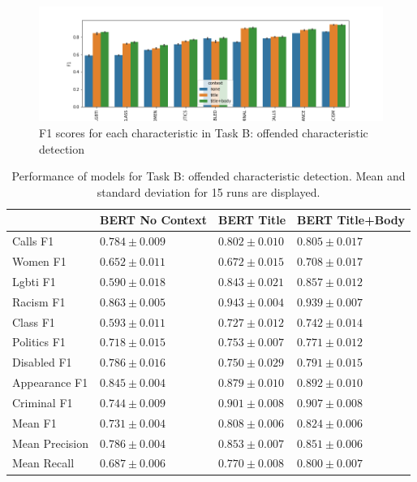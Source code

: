 \begin{figure}[t]
    \centering
    \includegraphics[width=\textwidth]{img/task_b_scores.png}
    \caption{F1 scores for each characteristic in Task B: offended characteristic detection}
    \label{fig:task_b_results}
\end{figure}

\begin{table}
    \centering
    \begin{tabular}{llll}
        \toprule
        {} &    BERT No Context &         BERT Title &    BERT Title+Body \\
        \midrule
        Calls F1       &  $0.784 \pm 0.009$ &  $0.802 \pm 0.010$ &  $0.805 \pm 0.017$ \\
        Women F1       &  $0.652 \pm 0.011$ &  $0.672 \pm 0.015$ &  $0.708 \pm 0.017$ \\
        Lgbti F1       &  $0.590 \pm 0.018$ &  $0.843 \pm 0.021$ &  $0.857 \pm 0.012$ \\
        Racism F1      &  $0.863 \pm 0.005$ &  $0.943 \pm 0.004$ &  $0.939 \pm 0.007$ \\
        Class F1       &  $0.593 \pm 0.011$ &  $0.727 \pm 0.012$ &  $0.742 \pm 0.014$ \\
        Politics F1    &  $0.718 \pm 0.015$ &  $0.753 \pm 0.007$ &  $0.771 \pm 0.012$ \\
        Disabled F1    &  $0.786 \pm 0.016$ &  $0.750 \pm 0.029$ &  $0.791 \pm 0.015$ \\
        Appearance F1  &  $0.845 \pm 0.004$ &  $0.879 \pm 0.010$ &  $0.892 \pm 0.010$ \\
        Criminal F1    &  $0.744 \pm 0.009$ &  $0.901 \pm 0.008$ &  $0.907 \pm 0.008$ \\
        \hline
        Mean F1        &  $0.731 \pm 0.004$ &  $0.808 \pm 0.006$ &  $0.824 \pm 0.006$ \\
        Mean Precision &  $0.786 \pm 0.004$ &  $0.853 \pm 0.007$ &  $0.851 \pm 0.006$ \\
        Mean Recall    &  $0.687 \pm 0.006$ &  $0.770 \pm 0.008$ &  $0.800 \pm 0.007$ \\
        \bottomrule
    \end{tabular}
    \caption{Performance of models for Task B: offended characteristic detection. Mean and standard deviation for 15 runs are displayed. }
    \label{tab:task_b_results}
\end{table}


